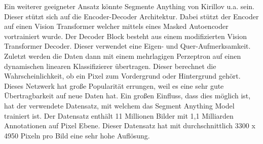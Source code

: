Ein weiterer geeigneter Ansatz könnte Segmente Anything \cite{sam2023} von Kirillov u.a.  sein. 
Dieser stützt sich auf die Encoder-Decoder Architektur. Dabei stützt der Encoder auf einen Vision Transformer \cite{DosovitskiyTransformer2020} welcher mittels eines Masked Autoencoder \cite{He.11.11.2021} vortrainiert wurde. 
Der Decoder Block besteht aus einem modifizierten Vision Transformer Decoder. Dieser verwendet eine Eigen- und Quer-Aufmerksamkeit. Zuletzt werden die Daten dann mit einem mehrlagigen Perzeptron auf einen dynamischen linearen Klassifizierer übertragen. Dieser berechnet die Wahrscheinlichkeit, ob ein Pixel zum Vordergrund oder Hintergrund gehört.     
Dieses Netzwerk hat große Popularität errungen, weil es eine sehr gute Übertragbarkeit auf neue Daten hat. Ein großen Einfluss, dass dies möglich ist, hat der verwendete Datensatz, mit welchem das Segment Anything Model trainiert ist. Der Datensatz enthält 11 Millionen Bilder mit 1,1 Milliarden Annotationen auf Pixel Ebene. Dieser Datensatz hat mit durchschnittlich 3300 x 4950 Pixeln pro Bild eine sehr hohe Auflösung.  
